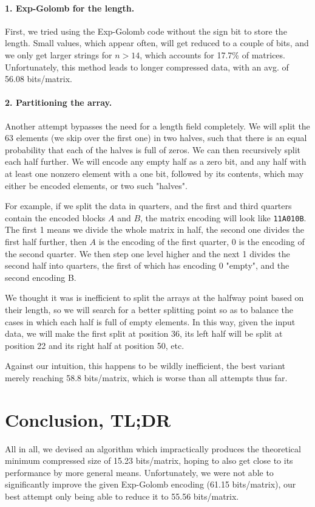 \documentclass[11pt]{llncs}
\begin{document}
\paragraph{1. Exp-Golomb for the length.} First, we tried using the Exp-Golomb code without the sign bit to store the length. Small values, which appear often, will get reduced to a couple of bits, and we only get larger strings for $n>14$, which accounts for 17.7\% of matrices. Unfortunately, this method leads to longer compressed data, with an avg. of 56.08 bits/matrix.

\paragraph{2. Partitioning the array.} Another attempt bypasses the need for a length field completely. We will split the 63 elements (we skip over the first one) in two halves, such that there is an equal probability that each of the halves is full of zeros. We can then recursively split each half further. We will encode any empty half as a zero bit, and any half with at least one nonzero element with a one bit, followed by its contents, which may either be encoded elements, or two such "halves".

For example, if we split the data in quarters, and the first and third quarters contain the encoded blocks $A$ and $B$, the matrix encoding will look like \texttt{11A010B}. The first 1 means we divide the whole matrix in half, the second one divides the first half further, then $A$ is the encoding of the first quarter, 0 is the encoding of the second quarter. We then step one level higher and the next 1 divides the second half into quarters, the first of which has encoding 0 "empty", and the second encoding B.

We thought it was is inefficient to split the arrays at the halfway point based on their length, so we will search for a better splitting point so as to balance the cases in which each half is full of empty elements. In this way, given the input data, we will make the first split at position 36, its left half will be split at position 22 and its right half at position 50, etc.

Against our intuition, this happens to be wildly inefficient, the best variant merely reaching 58.8 bits/matrix, which is worse than all attempts thus far.

\section{Conclusion, TL;DR}

All in all, we devised an algorithm which impractically produces the theoretical minimum compressed size of 15.23 bits/matrix, hoping to also get close to its performance by more general means. Unfortunately, we were not able to significantly improve the given Exp-Golomb encoding (61.15 bits/matrix), our best attempt only being able to reduce it to 55.56 bits/matrix.
\end{document}
